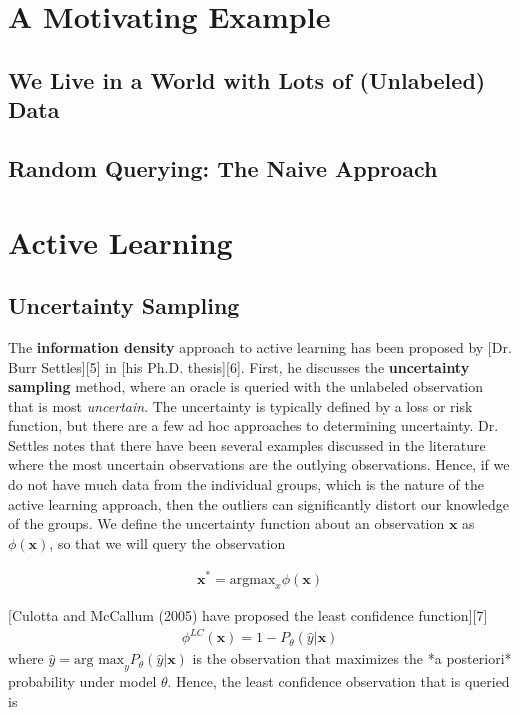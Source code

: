 \documentclass[article]{jss}
\begin{document}
\section{A Motivating Example} 

	\subsection{We Live in a World with Lots of (Unlabeled) Data} 

	\subsection{Random Querying: The Naive Approach} 
	
\section{Active Learning} 
	\subsection{Uncertainty Sampling}
	
	The \textbf{information density} approach to active learning has been proposed by [Dr. Burr Settles][5] in [his Ph.D. thesis][6]. First, he discusses the \textbf{uncertainty sampling} method, where an oracle is queried with the unlabeled observation that is most \emph{uncertain}. The uncertainty is typically defined by a loss or risk function, but there are a few ad hoc approaches to determining uncertainty. Dr. Settles notes that there have been several examples discussed in the literature where the most uncertain observations are the outlying observations. Hence, if we do not have much data from the individual groups, which is the nature of the active learning approach, then the outliers can significantly distort our knowledge of the groups. We define the uncertainty function about an observation $\bm x$ as $\phi(\bm x)$, so that we will query the observation

\begin{align}
	\bm x^* = \text{argmax}_x \phi(\bm x)
\end{align}

	[Culotta and McCallum (2005) have proposed the least confidence function][7] %
\begin{align}
	\phi^{LC}(\bm x) = 1 - P_{\theta}(\widehat{y} | \bm x)
\end{align}
where $\widehat{y} = \text{arg max}_y P_{\theta}(\widehat{y} | \bm x)$ is the observation that maximizes the *a posteriori* probability under model $\theta$. Hence, the least confidence observation that is queried is
\end{document}
